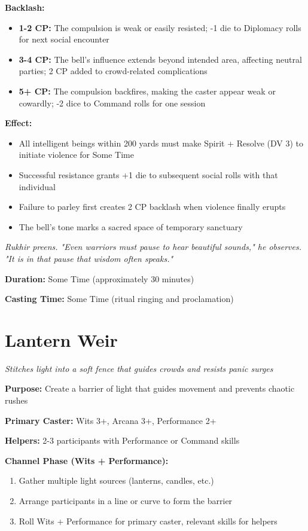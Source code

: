 \documentclass[12pt,twoside]{book}
\newcommand{\shadow}[1]{\textit{#1}}
\begin{document}
\textbf{Backlash:}
\begin{itemize}
\item \textbf{1-2 CP:} The compulsion is weak or easily resisted; -1 die to Diplomacy rolls for next social encounter
\item \textbf{3-4 CP:} The bell's influence extends beyond intended area, affecting neutral parties; 2 CP added to crowd-related complications
\item \textbf{5+ CP:} The compulsion backfires, making the caster appear weak or cowardly; -2 dice to Command rolls for one session
\end{itemize}

\textbf{Effect:}
\begin{itemize}
\item All intelligent beings within 200 yards must make Spirit + Resolve (DV 3) to initiate violence for Some Time
\item Successful resistance grants +1 die to subsequent social rolls with that individual
\item Failure to parley first creates 2 CP backlash when violence finally erupts
\item The bell's tone marks a sacred space of temporary sanctuary
\end{itemize}

\shadow{Rukhir preens. "Even warriors must pause to hear beautiful sounds," he observes. "It is in that pause that wisdom often speaks."}

\textbf{Duration:} Some Time (approximately 30 minutes)

\textbf{Casting Time:} Some Time (ritual ringing and proclamation)

\section*{Lantern Weir}
\textit{Stitches light into a soft fence that guides crowds and resists panic surges}

\textbf{Purpose:} Create a barrier of light that guides movement and prevents chaotic rushes

\textbf{Primary Caster:} Wits 3+, Arcana 3+, Performance 2+

\textbf{Helpers:} 2-3 participants with Performance or Command skills

\textbf{Channel Phase (Wits + Performance):}
\begin{enumerate}
\item Gather multiple light sources (lanterns, candles, etc.)
\item Arrange participants in a line or curve to form the barrier
\item Roll Wits + Performance for primary caster, relevant skills for helpers
\end{enumerate}
\end{document}
